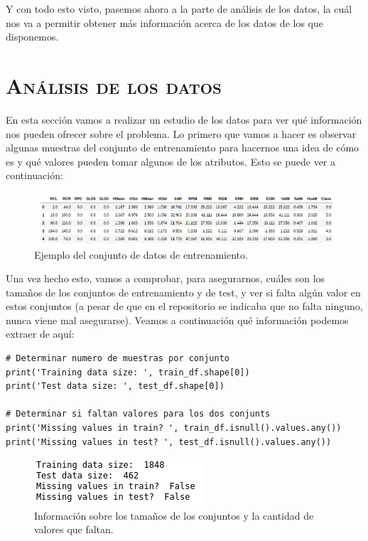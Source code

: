 \documentclass[11pt,a4paper]{article}
\begin{document}
Y con todo esto visto, pasemos ahora a la parte de análisis de los datos, la cuál nos va a permitir obtener más información acerca de
los datos de los que disponemos.

\newpage

\section{\textsc{Análisis de los datos}}

En esta sección vamos a realizar un estudio de los datos para ver qué información nos pueden ofrecer sobre el problema. Lo primero que
vamos a hacer es observar algunas muestras del conjunto de entrenamiento para hacernos una idea de cómo es y qué valores pueden tomar
algunos de los atributos. Esto se puede ver a continuación:

\begin{figure}[H]
    \centering
    \includegraphics[scale=0.4]{img/train_df_head.png}
    \caption{Ejemplo del conjunto de datos de entrenamiento.}
    \label{fig:train-df}
\end{figure}

Una vez hecho esto, vamos a comprobar, para asegurarnos, cuáles son los tamaños de los conjuntos de entrenamiento y de test, y ver
si falta algún valor en estos conjuntos (a pesar de que en el repositorio se indicaba que no falta ninguno, nunca viene mal asegurarse).
Veamos a continuación qué información podemos extraer de aquí:

\begin{lstlisting}
# Determinar numero de muestras por conjunto
print('Training data size: ', train_df.shape[0])
print('Test data size: ', test_df.shape[0])

# Determinar si faltan valores para los dos conjunts
print('Missing values in train? ', train_df.isnull().values.any())
print('Missing values in test? ', test_df.isnull().values.any())
\end{lstlisting}

\begin{figure}[H]
    \centering
    \includegraphics[scale=0.6]{img/df_info.png}
    \caption{Información sobre los tamaños de los conjuntos y la cantidad de valores que faltan.}
    \label{fig:train-test-stat}
\end{figure}
\end{document}
